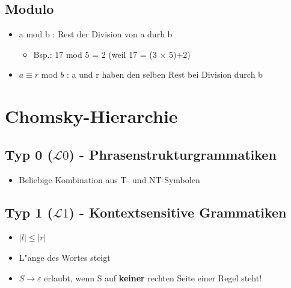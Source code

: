 \documentclass[11pt, a4paper]{scrartcl}
\newcommand{\rd}[1]{{\color{Red}#1}}
\begin{document}
\vspace{1em}

\subsection{Modulo}

\begin{itemize}
    \item a mod b \quad : \quad Rest der Division von a durh b 
    \begin{itemize}
        \item Bsp.: 17 mod 5 = \rd{2} (weil 17 = (3 $\times$ 5)+\rd{2})
    \end{itemize} 
    \item $a \equiv r$ mod $b$ \quad : \quad a und r haben den selben Rest bei Division durch b
\end{itemize}

\newpage


\section{Chomsky-Hierarchie}

\vspace{0.5em}

\subsection{Typ 0 ($\mathcal{L}0$) - Phrasenstrukturgrammatiken}

\begin{itemize}
    \item Beliebige Kombination aus T- und NT-Symbolen
\end{itemize}

\vspace{0.5em}

\subsection{ Typ 1 ($\mathcal{L}1$) - Kontextsensitive Grammatiken}

\begin{itemize}
    \item $|l|\leq|r|$
    \item L"ange des Wortes steigt
    \item $S\rightarrow\varepsilon$ erlaubt, wenn S auf \textbf{keiner} rechten Seite einer Regel steht!
\end{itemize}
\end{document}
